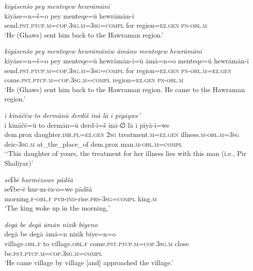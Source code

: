 \ea \label{ZP.20}
\textit{kīyāsenšo pey menteqew hewrāmānī} \\ 
\gll kīyāse=n=š=o pey menteqe=ū hewrāmān-ī \\ 
 send\textsc{.pst}\textsc{.ptcp}\textsc{.m}\textsc{=cop}\textsc{.3sg}\textsc{.m}\textsc{=3sg}\textsc{=compl} for region\textsc{\textsc{=ez.gen}} \textsc{pn}\textsc{-obl}\textsc{.m} \\ 
\glt `He (Ghaws) sent him back to the Hawraman region.'
\z 
 
\ea \label{ZP.21}
\textit{kīyāsenšo pey menteqew hewrāmānīw āmāno menteqew hewrāmānī} \\ 
\gll kīyāse=n=š=o pey menteqe=ū hewrāmān-ī=ū āmā=n=o menteqe=ū hewrāmān-ī \\ 
 send\textsc{.pst}\textsc{.ptcp}\textsc{.m}\textsc{=cop}\textsc{.3sg}\textsc{.m}\textsc{=3sg}\textsc{=compl} for region\textsc{\textsc{=ez.gen}} \textsc{pn}\textsc{-obl}\textsc{.m}\textsc{\textsc{=ez.gen}} come\textsc{.pst}\textsc{.ptcp}\textsc{.m}\textsc{=cop}\textsc{.3sg}\textsc{.m}\textsc{=compl} region\textsc{\textsc{=ez.gen}} \textsc{pn}\textsc{-obl}\textsc{.m} \\ 
\glt `He (Ghaws) sent him back to the Hawraman region. He came to the Hawraman region.'
\z 
 
\ea \label{ZP.33}
\textit{ī kināčēw to dermānū derdīš īnā lā ī pīyāywe’} \\ 
\gll ī kināčē=ū to dermān=ū derd-ī=š īnā-∅ lā ī pīyā-ī=we \\ 
 dem.prox daughter\textsc{.dir}\textsc{.pl}\textsc{\textsc{=ez.gen}} \textsc{2sg} treatment\textsc{.m}\textsc{\textsc{=ez.gen}} illness\textsc{.m}\textsc{-obl}\textsc{.m}\textsc{=3sg} deic\textsc{-3sg}\textsc{.m} at\_the\_place\_of dem.prox man\textsc{.m}\textsc{-obl}\textsc{.m}\textsc{=compl} \\ 
\glt `‘This daughter of yours, the treatment for her illness lies with this man (i.e., Pir Shaliyar)'
\z 
 
\ea \label{ZP.37}
\textit{seʕbē hurmēzowe pādšā} \\ 
\gll seʕbe-ē hur-m-ēz-o=we pādšā \\ 
 morning\textsc{.f}\textsc{-obl}\textsc{.f} \textsc{pvb-}\textsc{ind-}rise\textsc{.prs}\textsc{-3sg}\textsc{=compl} king\textsc{.m} \\ 
\glt `The king woke up in the morning,'
\z 
 
\ea \label{ZP.42}
\textit{degā be degā āmān nizīk bīyeno} \\ 
\gll degā be degā āmā=n nizīk bīye=n=o \\ 
 village\textsc{.obl}\textsc{.f} to village\textsc{.obl}\textsc{.f} come\textsc{.pst}\textsc{.ptcp}\textsc{.m}\textsc{=cop}\textsc{.3sg}\textsc{.m} close be\textsc{.pst}\textsc{.ptcp}\textsc{.m}\textsc{=cop}\textsc{.3sg}\textsc{.m}\textsc{=compl} \\ 
\glt `He came village by village [and] approached the village.'
\z 
 
